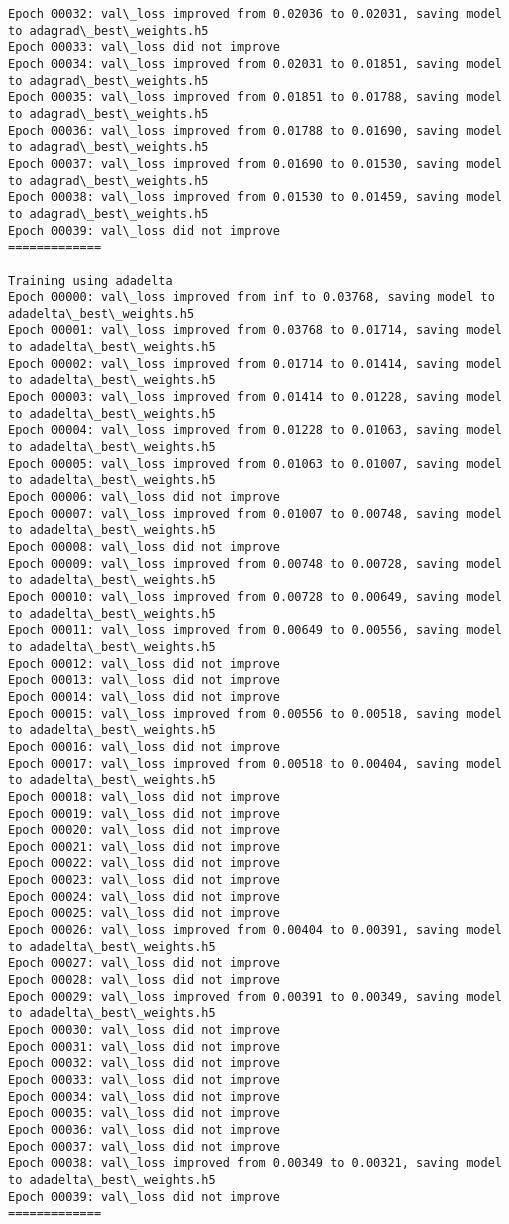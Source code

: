 \documentclass[11pt]{article}
\begin{document}
\begin{Verbatim}[commandchars=\\\{\}]
Epoch 00032: val\_loss improved from 0.02036 to 0.02031, saving model to adagrad\_best\_weights.h5
Epoch 00033: val\_loss did not improve
Epoch 00034: val\_loss improved from 0.02031 to 0.01851, saving model to adagrad\_best\_weights.h5
Epoch 00035: val\_loss improved from 0.01851 to 0.01788, saving model to adagrad\_best\_weights.h5
Epoch 00036: val\_loss improved from 0.01788 to 0.01690, saving model to adagrad\_best\_weights.h5
Epoch 00037: val\_loss improved from 0.01690 to 0.01530, saving model to adagrad\_best\_weights.h5
Epoch 00038: val\_loss improved from 0.01530 to 0.01459, saving model to adagrad\_best\_weights.h5
Epoch 00039: val\_loss did not improve
=============

Training using adadelta
Epoch 00000: val\_loss improved from inf to 0.03768, saving model to adadelta\_best\_weights.h5
Epoch 00001: val\_loss improved from 0.03768 to 0.01714, saving model to adadelta\_best\_weights.h5
Epoch 00002: val\_loss improved from 0.01714 to 0.01414, saving model to adadelta\_best\_weights.h5
Epoch 00003: val\_loss improved from 0.01414 to 0.01228, saving model to adadelta\_best\_weights.h5
Epoch 00004: val\_loss improved from 0.01228 to 0.01063, saving model to adadelta\_best\_weights.h5
Epoch 00005: val\_loss improved from 0.01063 to 0.01007, saving model to adadelta\_best\_weights.h5
Epoch 00006: val\_loss did not improve
Epoch 00007: val\_loss improved from 0.01007 to 0.00748, saving model to adadelta\_best\_weights.h5
Epoch 00008: val\_loss did not improve
Epoch 00009: val\_loss improved from 0.00748 to 0.00728, saving model to adadelta\_best\_weights.h5
Epoch 00010: val\_loss improved from 0.00728 to 0.00649, saving model to adadelta\_best\_weights.h5
Epoch 00011: val\_loss improved from 0.00649 to 0.00556, saving model to adadelta\_best\_weights.h5
Epoch 00012: val\_loss did not improve
Epoch 00013: val\_loss did not improve
Epoch 00014: val\_loss did not improve
Epoch 00015: val\_loss improved from 0.00556 to 0.00518, saving model to adadelta\_best\_weights.h5
Epoch 00016: val\_loss did not improve
Epoch 00017: val\_loss improved from 0.00518 to 0.00404, saving model to adadelta\_best\_weights.h5
Epoch 00018: val\_loss did not improve
Epoch 00019: val\_loss did not improve
Epoch 00020: val\_loss did not improve
Epoch 00021: val\_loss did not improve
Epoch 00022: val\_loss did not improve
Epoch 00023: val\_loss did not improve
Epoch 00024: val\_loss did not improve
Epoch 00025: val\_loss did not improve
Epoch 00026: val\_loss improved from 0.00404 to 0.00391, saving model to adadelta\_best\_weights.h5
Epoch 00027: val\_loss did not improve
Epoch 00028: val\_loss did not improve
Epoch 00029: val\_loss improved from 0.00391 to 0.00349, saving model to adadelta\_best\_weights.h5
Epoch 00030: val\_loss did not improve
Epoch 00031: val\_loss did not improve
Epoch 00032: val\_loss did not improve
Epoch 00033: val\_loss did not improve
Epoch 00034: val\_loss did not improve
Epoch 00035: val\_loss did not improve
Epoch 00036: val\_loss did not improve
Epoch 00037: val\_loss did not improve
Epoch 00038: val\_loss improved from 0.00349 to 0.00321, saving model to adadelta\_best\_weights.h5
Epoch 00039: val\_loss did not improve
=============


\end{Verbatim}
\end{document}
